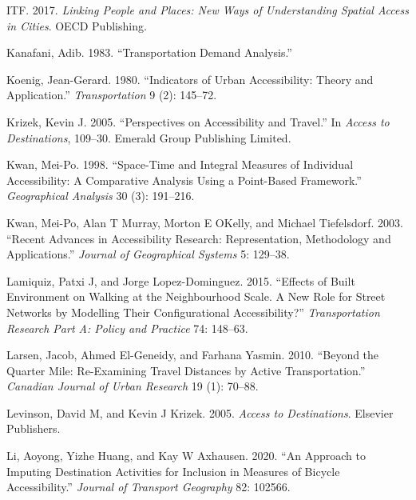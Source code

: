 \documentclass[preprint, 3p,
authoryear]{elsarticle} %
\newlength{\cslhangindent}
\newlength{\cslentryspacingunit} %
\newenvironment{CSLReferences}[2] %
 {%
  \setlength{\parindent}{0pt}
  \ifodd #1
  \let\oldpar\par
  \def\par{\hangindent=\cslhangindent\oldpar}
  \fi
  \setlength{\parskip}{#2\cslentryspacingunit}
 }%
 {}
\begin{document}
\begin{CSLReferences}{1}{0}
\leavevmode{}%
ITF. 2017. \emph{Linking People and Places: New Ways of Understanding
Spatial Access in Cities}. OECD Publishing.

\leavevmode{}%
Kanafani, Adib. 1983. {``Transportation Demand Analysis.''}

\leavevmode{}%
Koenig, Jean-Gerard. 1980. {``Indicators of Urban Accessibility: Theory
and Application.''} \emph{Transportation} 9 (2): 145--72.

\leavevmode{}%
Krizek, Kevin J. 2005. {``Perspectives on Accessibility and Travel.''}
In \emph{Access to Destinations}, 109--30. Emerald Group Publishing
Limited.

\leavevmode{}%
Kwan, Mei-Po. 1998. {``Space-Time and Integral Measures of Individual
Accessibility: A Comparative Analysis Using a Point-Based Framework.''}
\emph{Geographical Analysis} 30 (3): 191--216.

\leavevmode{}%
Kwan, Mei-Po, Alan T Murray, Morton E OKelly, and Michael Tiefelsdorf.
2003. {``Recent Advances in Accessibility Research: Representation,
Methodology and Applications.''} \emph{Journal of Geographical Systems}
5: 129--38.

\leavevmode{}%
Lamiquiz, Patxi J, and Jorge Lopez-Dominguez. 2015. {``Effects of Built
Environment on Walking at the Neighbourhood Scale. A New Role for Street
Networks by Modelling Their Configurational Accessibility?''}
\emph{Transportation Research Part A: Policy and Practice} 74: 148--63.

\leavevmode{}%
Larsen, Jacob, Ahmed El-Geneidy, and Farhana Yasmin. 2010. {``Beyond the
Quarter Mile: Re-Examining Travel Distances by Active Transportation.''}
\emph{Canadian Journal of Urban Research} 19 (1): 70--88.

\leavevmode{}%
Levinson, David M, and Kevin J Krizek. 2005. \emph{Access to
Destinations}. Elsevier Publishers.

\leavevmode{}%
Li, Aoyong, Yizhe Huang, and Kay W Axhausen. 2020. {``An Approach to
Imputing Destination Activities for Inclusion in Measures of Bicycle
Accessibility.''} \emph{Journal of Transport Geography} 82: 102566.


\end{CSLReferences}
\end{document}
